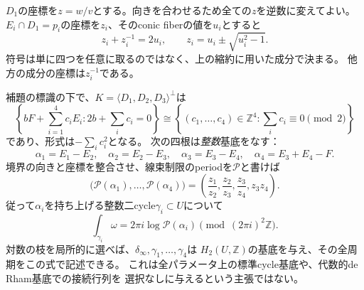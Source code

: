 $D_1$の座標を$z=w/v$とする。向きを合わせるため全ての$z$を逆数に変えてよい。
$E_i\cap D_1=p_i$の座標を$z_i$、そのconic fiberの値を$u_i$とすると
\begin{equation}\label{eq:zi-conic-trace}
 z_i+z_i^{-1}=2u_i,\qquad z_i=u_i\pm\sqrt{u_i^2-1}.
\end{equation}
符号は単に四つを任意に取るのではなく、上の縮約に用いた成分で決まる。
他方の成分の座標は$z_i^{-1}$である。

\begin{theorem}[全四方向の代数的周期]
\label{thm:four-integer-D4-periods}
補題の標識の下で、$K=\langle D_1,D_2,D_3\rangle^\perp$は
\[
 \left\{bF+\sum_{i=1}^4 c_iE_i:2b+\sum_i c_i=0\right\}
 \cong\left\{(c_1,\ldots,c_4)\in\mathbb Z^4:\sum_i c_i\equiv0\pmod2\right\}
\]
であり、形式は$-\sum_i c_i^2$となる。
次の四根は\emph{整数}基底をなす：
\[
 \alpha_1=E_1-E_2,\quad\alpha_2=E_2-E_3,\quad
 \alpha_3=E_3-E_4,\quad\alpha_4=E_3+E_4-F.
\]
境界の向きと座標を整合させ、線束制限のperiodを$\mathcal P$と書けば
\begin{equation}\label{eq:four-D4-characters}
 \boxed{\bigl(\mathcal P(\alpha_1),\ldots,\mathcal P(\alpha_4)\bigr)
 =\left(\frac{z_1}{z_2},\frac{z_2}{z_3},\frac{z_3}{z_4},z_3z_4\right).}
\end{equation}
従って$\alpha_i$を持ち上げる整数二cycle$\gamma_i\subset U$について
\[
 \int_{\gamma_i}\omega=2\pi i\log\mathcal P(\alpha_i)
 \pmod{(2\pi i)^2\mathbb Z}.
\]
対数の枝を局所的に選べば、$\delta_\infty,\gamma_1,\ldots,\gamma_4$は
$H_2(U,\mathbb Z)$の基底を与え、その全周期をこの式で記述できる。
これは全パラメータ上の標準cycle基底や、代数的de Rham基底での接続行列を
選択なしに与えるという主張ではない。
\end{theorem}
